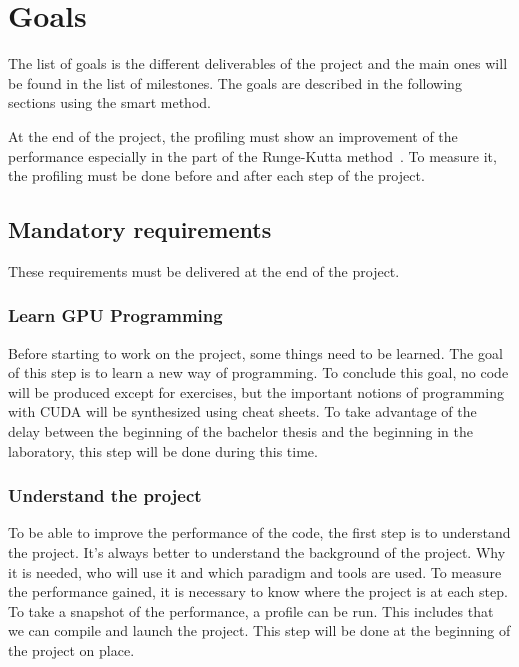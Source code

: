 \chapter{Goals}
\label{spec:ch:goals}

The list of goals is the different deliverables of the project and the main ones will be found in the list of milestones.
The goals are described in the following sections using the \acrshort{smart} method.

At the end of the project, the profiling must show an improvement of the performance especially in the part of the Runge-Kutta method~\cite{Runge-Kutta-methods}.
To measure it, the profiling must be done before and after each step of the project.


\section{Mandatory requirements}
\label{spec:ch:goals:mandatory-requirements}

These requirements must be delivered at the end of the project.


\subsection{Learn GPU Programming}
\label{spec:ch:goals:mandatory-requirements:learn-gpu-programming}

Before starting to work on the project, some things need to be learned.
The goal of this step is to learn a new way of programming.
To conclude this goal, no code will be produced except for exercises, but the important notions of programming with CUDA will be synthesized using cheat sheets.
To take advantage of the delay between the beginning of the bachelor thesis and the beginning in the laboratory, this step will be done during this time.


\subsection{Understand the project}
\label{spec:ch:goals:mandatory-requirements:understand-the-project}

To be able to improve the performance of the code, the first step is to understand the project.
It's always better to understand the background of the project.
Why it is needed, who will use it and which paradigm and tools are used.
To measure the performance gained, it is necessary to know where the project is at each step.
To take a snapshot of the performance, a profile can be run.
This includes that we can compile and launch the project.
This step will be done at the beginning of the project on place.



